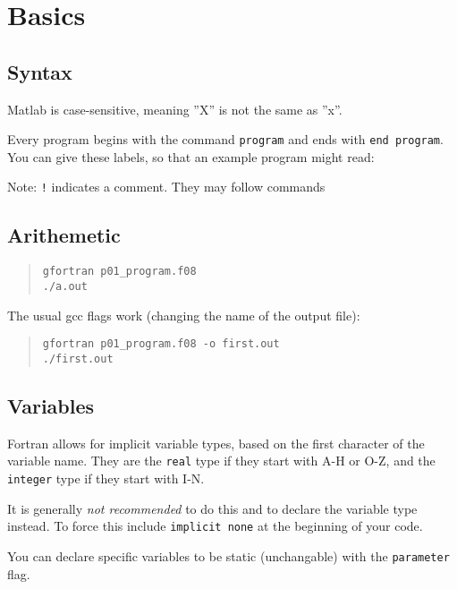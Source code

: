 
\section{Basics}


\subsection{Syntax}

Matlab is case-sensitive, meaning ''X'' is not the same as ''x''.

Every program begins with the command \texttt{program} and ends with \texttt{end program}. You can give these labels, so that an example program might read:
\begin{quote}

\end{quote}
\noindent Note: \texttt{!} indicates a comment. They may follow commands


\subsection{Arithemetic}

\begin{quote}
\begin{verbatim}
gfortran p01_program.f08
./a.out
\end{verbatim}
\end{quote}

\noindent The usual gcc flags work (changing the name of the output file):
\begin{quote}
\begin{verbatim}
gfortran p01_program.f08 -o first.out
./first.out
\end{verbatim}
\end{quote}


\subsection{Variables}
Fortran allows for implicit variable types, based on the first character of the variable name. They are the \texttt{real} type if they start with A-H or O-Z, and the \texttt{integer} type if they start with I-N.

It is generally \emph{not recommended} to do this and to declare the variable type instead. To force this include \texttt{implicit none} at the beginning of your code.

You can declare specific variables to be static (unchangable) with the \texttt{parameter} flag.

